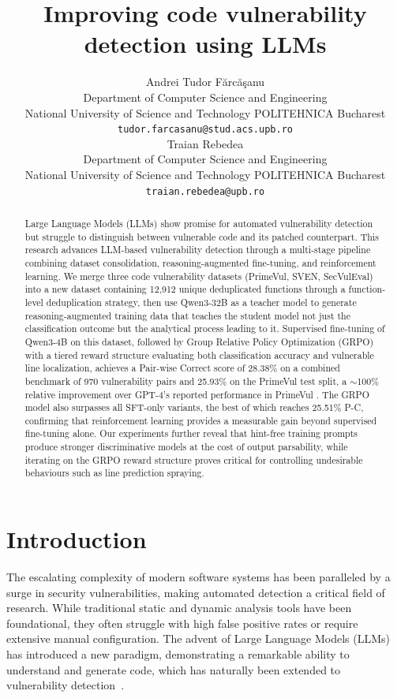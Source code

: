 \documentclass{article}
\title{Improving code vulnerability detection using LLMs}
\author{%
  Andrei Tudor F\u{a}rc\u{a}\c{s}anu\\
  Department of Computer Science and Engineering\\
  National University of Science and Technology POLITEHNICA Bucharest\\
  \texttt{tudor.farcasanu@stud.acs.upb.ro} \\
  \And
  Traian Rebedea \\
  Department of Computer Science and Engineering\\
  National University of Science and Technology POLITEHNICA Bucharest\\
  \texttt{traian.rebedea@upb.ro} \\
}
\begin{document}
\maketitle


\begin{abstract}
Large Language Models (LLMs) show promise for automated vulnerability detection but struggle to distinguish between vulnerable code and its patched counterpart. This research advances LLM-based vulnerability detection through a multi-stage pipeline combining dataset consolidation, reasoning-augmented fine-tuning, and reinforcement learning. We merge three code vulnerability datasets (PrimeVul, SVEN, SecVulEval) into a new dataset containing 12,912 unique deduplicated functions through a function-level deduplication strategy, then use Qwen3-32B as a teacher model to generate reasoning-augmented training data that teaches the student model not just the classification outcome but the analytical process leading to it. Supervised fine-tuning of Qwen3-4B on this dataset, followed by Group Relative Policy Optimization (GRPO) with a tiered reward structure evaluating both classification accuracy and vulnerable line localization, achieves a Pair-wise Correct score of 28.38\% on a combined benchmark of 970 vulnerability pairs and 25.93\% on the PrimeVul test split, a $\sim$100\% relative improvement over GPT-4's reported performance in PrimeVul \cite{primevul}. The GRPO model also surpasses all SFT-only variants, the best of which reaches 25.51\% P-C, confirming that reinforcement learning provides a measurable gain beyond supervised fine-tuning alone. Our experiments further reveal that hint-free training prompts produce stronger discriminative models at the cost of output parsability, while iterating on the GRPO reward structure proves critical for controlling undesirable behaviours such as line prediction spraying.
\end{abstract}

\section{Introduction}

The escalating complexity of modern software systems has been paralleled by a surge in security vulnerabilities, making automated detection a critical field of research. While traditional static and dynamic analysis tools have been foundational, they often struggle with high false positive rates or require extensive manual configuration. The advent of Large Language Models (LLMs) has introduced a new paradigm, demonstrating a remarkable ability to understand and generate code, which has naturally been extended to vulnerability detection~\cite{vulnllmeval, if_llms_would_just_look}.
\end{document}
